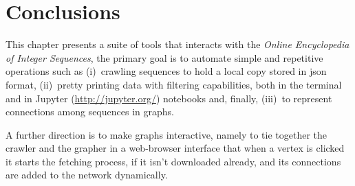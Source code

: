 \section*{Conclusions}

This chapter presents a suite of tools that interacts with the \textit{Online
Encyclopedia of Integer Sequences}, the primary goal is to automate simple and
repetitive operations such as (i)~crawling sequences to hold a local copy stored
in json format, (ii)~pretty printing data with filtering capabilities, both
in the terminal and in Jupyter (\url{http://jupyter.org/}) notebooks and,
finally, (iii)~to represent connections among sequences in graphs.

A further direction is to make graphs interactive, namely to tie together the
crawler and the grapher in a web-browser interface that when a vertex is
clicked it starts the fetching process, if it isn't downloaded already, and its
connections are added to the network dynamically.

